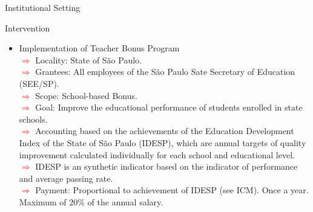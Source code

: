 \documentclass{beamer}
\begin{document}
\begin{frame}[label=Main1]{Institutional Setting}
\begin{block}{\centering \Large Intervention}
\vspace{-18pt} \flushright \hyperlink{IDESP}{\beamerbutton{\textcolor{red}{IDESP}}} \vspace{-18pt} \hspace{5pt} \hyperlink{ICM}{\beamerbutton{\textcolor{red}{ICM}}}
\vspace{15pt}
\begin{itemize}
\item \normalsize Implementation of Teacher Bonus Program
\\ \tiny\textcolor{red}{$\Longrightarrow$} Locality: State of São Paulo.
\\ \tiny\textcolor{red}{$\Longrightarrow$} Grantees: All employees of the São Paulo Sate Secretary of Education (SEE/SP).
\\ \tiny\textcolor{red}{$\Longrightarrow$} Scope: School-based Bonus.
\\ \tiny\textcolor{red}{$\Longrightarrow$} Goal: Improve the educational performance of students enrolled in state schools.
\\ \tiny\textcolor{red}{$\Longrightarrow$} Accounting based on the achievements of the Education Development Index of the State of São Paulo (IDESP), which are annual targets of quality improvement calculated individually for each school and educational level.
\\ \tiny\textcolor{red}{$\Longrightarrow$} IDESP is an synthetic indicator based on the indicator of performance and average passing rate. 
\\ \tiny\textcolor{red}{$\Longrightarrow$} Payment: Proportional to achievement of IDESP (see ICM). Once a year. Maximum of $20\%$ of the annual salary.
\end{itemize}
\end{block}
\end{frame}
\end{document}
